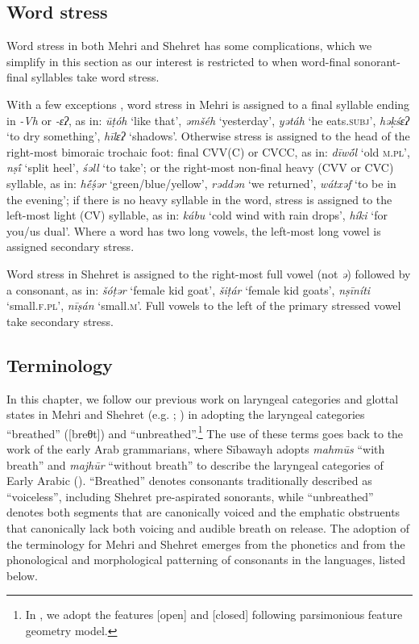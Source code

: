 \documentclass[output=paper]{langscibook}
\begin{document}
\subsection{Word stress} %
\label{sec:watson:2.4}
Word stress in both Mehri and Shehret has some complications, which we simplify in this section as our interest is restricted to when word-final sonorant-final syllables take word stress.

With a few exceptions \citep{WatsonEtAl2020}, word stress in Mehri is assigned to a final syllable ending in \textit{-Vh} or \textit{-ɛʔ}, as in: \textit{ūṭóh} ‘like that’, \textit{əmšéh} ‘yesterday’, \textit{yətáh} ‘he eats.\textsc{subj}’, \textit{həḳśɛʔ} ‘to dry something’, \textit{hīlɛʔ} ‘shadows’. Otherwise stress is assigned to the head of the right-most bimoraic trochaic foot: final CVV(C) or CVCC, as in: \textit{dīw\'{ō}l} ‘old \textsc{m.pl}’, \textit{nṣ\'{ī}} ‘split heel’, \textit{śəll} ‘to take’; or the right-most non-final heavy (CVV or CVC) syllable, as in: \textit{h\'{ē}ṣ́ər} ‘green/blue/yellow’, \textit{rəddən} ‘we returned’, \textit{wátxəf} ‘to be in the evening’; if there is no heavy syllable in the word, stress is assigned to the left-most light (CV) syllable, as in: \textit{kábu} ‘cold wind with rain drops’, \textit{híki} ‘for you/us dual’. Where a word has two long vowels, the left-most long vowel is assigned secondary stress.

Word stress in Shehret is assigned to the right-most full vowel (not \textit{ə}) followed by a consonant, as in: \textit{šóṭər} ‘female kid goat’, \textit{šiṭár} ‘female kid goats’, \textit{nṣīníti} ‘small.\textsc{f.pl}’, \textit{nīṣán} ‘small.\textsc{m}’. Full vowels to the left of the primary stressed vowel take secondary stress.

\subsection{Terminology} %
\label{sec:watson:2.5}
\begin{sloppypar}
In this chapter, we follow our previous work on laryngeal categories and glottal states in Mehri and Shehret (e.g. \citealt{WatsonHeselwood2016}; \citealt{WatsonEtAl2020}) in adopting the laryngeal categories ``breathed''
([breθt]) and ``unbreathed''.\footnote{In
  \citet{WatsonHeselwood2016}, we adopt the features [open] and [closed] following  parsimonious feature geometry model.}  The use of these terms goes back to the work of the early Arab grammarians, where Sībawayh adopts \textit{mahmūs} ``with breath''
  and \textit{majhūr} ``without breath''
  to describe the laryngeal categories of Early Arabic (\citealt{HeselwoodMaghrabi2015}). ``Breathed''
  denotes consonants traditionally described as ``voiceless'', including Shehret pre-aspirated sonorants, while
  ``unbreathed'' denotes both segments that are canonically voiced and the emphatic obstruents that canonically lack both voicing and audible breath on release. The adoption of the terminology for Mehri and Shehret emerges from the phonetics and from the phonological and morphological patterning of consonants in the languages, listed below.
\end{sloppypar}
\end{document}
